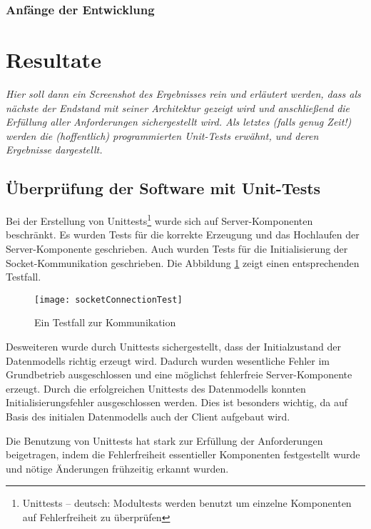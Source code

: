 \subsubsection{Anfänge der Entwicklung}



\section{Resultate}
\label{sec:Resultate}

\emph{Hier soll dann ein Screenshot des Ergebnisses rein und erläutert werden, dass als nächste der Endstand mit seiner Architektur gezeigt wird und anschließend die Erfüllung aller Anforderungen sichergestellt wird. Als letztes (falls genug Zeit!) werden die (hoffentlich) programmierten Unit-Tests erwähnt, und deren Ergebnisse dargestellt.}

\subsection{Überprüfung der Software mit Unit-Tests}
\label{subsec:unittests}

Bei der Erstellung von Unittests\footnote{Unittests -- deutsch: Modultests werden benutzt um einzelne Komponenten auf Fehlerfreiheit zu überprüfen} wurde sich auf Server-Komponenten beschränkt. Es wurden Tests für die korrekte Erzeugung und das Hochlaufen der Server-Komponente geschrieben. Auch wurden Tests für die Initialisierung der Socket-Kommunikation geschrieben. Die Abbildung \ref{fig:ComTest} zeigt einen entsprechenden Testfall.

\begin{figure}[htp]
	\centering
	\captionsetup{justification=centering}
	\texttt{[image: socketConnectionTest]}
	\caption[Socket-Test]{Ein Testfall zur Kommunikation}
	\label{fig:ComTest}
\end{figure}

\noindent Desweiteren wurde durch Unittests sichergestellt, dass der Initialzustand der Datenmodells richtig erzeugt wird. Dadurch wurden wesentliche Fehler im Grundbetrieb ausgeschlossen und eine möglichst fehlerfreie Server-Komponente erzeugt. Durch die erfolgreichen Unittests des Datenmodells konnten Initialisierungsfehler ausgeschlossen werden. Dies ist besonders wichtig, da auf Basis des initialen Datenmodells auch der Client aufgebaut wird.

Die Benutzung von Unittests hat stark zur Erfüllung der Anforderungen beigetragen, indem die Fehlerfreiheit essentieller Komponenten festgestellt wurde und nötige Änderungen frühzeitig erkannt wurden.

